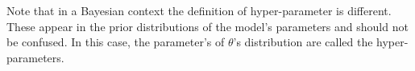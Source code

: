 Note that in a Bayesian context the definition of hyper-parameter is different. These appear in the  prior distributions of the model's parameters and should not be confused. In this case, the parameter's of $\theta$'s distribution are called the hyper-parameters. 



\textit{}

\textit{}

\textit{}

\textit{}

\textit{} 